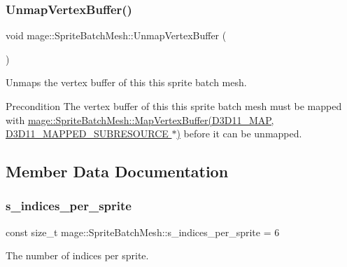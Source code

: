 \subsubsection{\texorpdfstring{Unmap\+Vertex\+Buffer()}{UnmapVertexBuffer()}}
{\footnotesize\ttfamily void mage\+::\+Sprite\+Batch\+Mesh\+::\+Unmap\+Vertex\+Buffer (\begin{DoxyParamCaption}{ }\end{DoxyParamCaption})}

Unmaps the vertex buffer of this this sprite batch mesh.

\begin{DoxyPrecond}{Precondition}
The vertex buffer of this this sprite batch mesh must be mapped with \hyperlink{classmage_1_1_sprite_batch_mesh_ab790dbbd3cb685c1f14d7ca1e9ed639b}{mage\+::\+Sprite\+Batch\+Mesh\+::\+Map\+Vertex\+Buffer(\+D3\+D11\+\_\+\+M\+A\+P, D3\+D11\+\_\+\+M\+A\+P\+P\+E\+D\+\_\+\+S\+U\+B\+R\+E\+S\+O\+U\+R\+C\+E $\ast$)} before it can be unmapped. 
\end{DoxyPrecond}


\subsection{Member Data Documentation}
\hypertarget{classmage_1_1_sprite_batch_mesh_a9560987925304ec757cac212d8b921f5}{}\label{classmage_1_1_sprite_batch_mesh_a9560987925304ec757cac212d8b921f5} 
\subsubsection{\texorpdfstring{s\+\_\+indices\+\_\+per\+\_\+sprite}{s\_indices\_per\_sprite}}
{\footnotesize\ttfamily const size\+\_\+t mage\+::\+Sprite\+Batch\+Mesh\+::s\+\_\+indices\+\_\+per\+\_\+sprite = 6\hspace{0.3cm}{\ttfamily [static]}}

The number of indices per sprite. \hypertarget{classmage_1_1_sprite_batch_mesh_aa4c18beb1d7355a184ac3c93c6a254e3}{}\label{classmage_1_1_sprite_batch_mesh_aa4c18beb1d7355a184ac3c93c6a254e3} 
